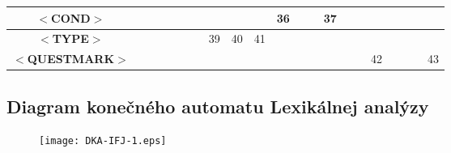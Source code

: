 \documentclass[a4paper,11pt]{article}
\begin{document}
\begin{table}[htbp]
\begin{tabular}{|c||c|c|c|c|c|c|c|c|c|c|c|c|c|c|c|c|c|c|c|c|}
\hline
\textbf{$<$COND$>$}          &                             &                        &                        &                         &                           &                             &                              &                             &                             & \multicolumn{1}{c|}{36}  &                           &                         & \multicolumn{1}{c|}{37}  &                          &                            &                         &                             &                         &                           & \multicolumn{1}{l|}{}  \\ 
\hline
\textbf{$<$TYPE$>$}          &                             &                        &                        &                         &                           &                             & \multicolumn{1}{c|}{39}      & \multicolumn{1}{c|}{40}     & \multicolumn{1}{c|}{41}     &                          &                           &                         &                          &                          &                            &                         &                             &                         &                           & \multicolumn{1}{l|}{}  \\ 
\hline
\textbf{$<$QUESTMARK$>$}     &                             &                        &                        &                         &                           &                             &                              &                             &                             &                          &                           &                         &                          &                          &                            & \multicolumn{1}{c|}{42} &                             &                         &                           & 43                     \\
\hline
\end{tabular}
\end{table}

\newpage

\subsection{Diagram konečného automatu Lexikálnej analýzy}
\begin{figure}[H]
	\centering
	\texttt{[image: DKA-IFJ-1.eps]}
\end{figure}
\end{document}
